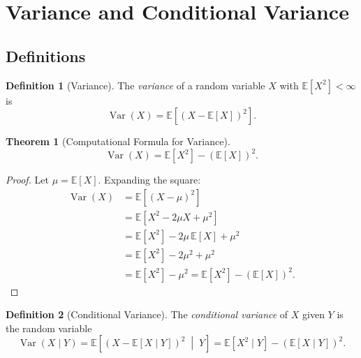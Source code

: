 \documentclass[11pt,a4paper]{article}
\theoremstyle{definition}
\newtheorem{definition}{Definition}[section]
\theoremstyle{plain}
\newtheorem{theorem}{Theorem}[section]
\theoremstyle{remark}
\DeclareMathOperator{\Var}{Var}
\newcommand{\E}{\mathbb{E}}
\begin{document}
\section{Variance and Conditional Variance}
\label{sec:variance}

\subsection{Definitions}
\label{subsec:var_def}

\begin{definition}[Variance]
\label{def:variance}
The \emph{variance} of a random variable $X$ with $\E[X^2] < \infty$ is
\begin{equation}
    \Var(X) = \E\!\left[(X - \E[X])^2\right].
    \label{eq:var_def}
\end{equation}
\end{definition}

\begin{theorem}[Computational Formula for Variance]
\label{thm:var_formula}
\begin{equation}
    \Var(X) = \E[X^2] - (\E[X])^2.
    \label{eq:var_formula}
\end{equation}
\end{theorem}

\begin{proof}
Let $\mu = \E[X]$. Expanding the square:
\begin{align}
    \Var(X) &= \E[(X - \mu)^2] \nonumber\\
    &= \E[X^2 - 2\mu X + \mu^2] \nonumber\\
    &= \E[X^2] - 2\mu\,\E[X] + \mu^2 \tag{linearity} \\
    &= \E[X^2] - 2\mu^2 + \mu^2 \nonumber\\
    &= \E[X^2] - \mu^2 = \E[X^2] - (\E[X])^2. \label{eq:var_formula_proof}
\end{align}
\end{proof}

\begin{definition}[Conditional Variance]
\label{def:cond_var}
The \emph{conditional variance} of $X$ given $Y$ is the random variable
\begin{equation}
    \Var(X \mid Y) = \E\!\left[(X - \E[X \mid Y])^2 \;\middle|\; Y\right] = \E[X^2 \mid Y] - (\E[X \mid Y])^2.
    \label{eq:cond_var}
\end{equation}
\end{definition}
\end{document}
